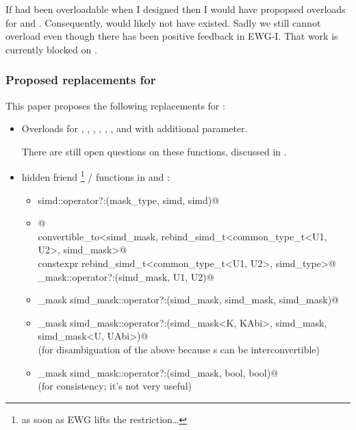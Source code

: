 If  had been overloadable when I designed \stdx\simd{} then I
would have propopsed  overloads for  and .
Consequently,  would likely not have existed.
Sadly we still cannot overload  even though there has been
positive feedback in EWG-I.
That work is currently blocked on \cite{P2600R0}.

\subsubsection{Proposed replacements for }

This paper proposes the following replacements for \stdx{}:

\begin{itemize}
  \item Overloads for ,
    ,
    ,
    , ,
    , and  with additional  parameter.

    There are still open questions on these functions, discussed in .

  \item hidden friend \footnote{as soon as EWG lifts the
    restriction\ldots} /  functions in 
    and :
    \begin{itemize}
      \item \lstinline@simd simd::operator?:(mask_type, simd, simd)@
      \item {}@\\
        \lstinline@requires convertible_to<simd_mask, rebind_simd_t<common_type_t<U1, U2>, simd_mask>@\\
        \lstinline@friend constexpr rebind_simd_t<common_type_t<U1, U2>, simd_type>@\\
        \lstinline@simd_mask::operator?:(simd_mask, U1, U2)@
      \item \lstinline@simd_mask simd_mask::operator?:(simd_mask, simd_mask, simd_mask)@
      \item \lstinline@simd_mask simd_mask::operator?:(simd_mask<K, KAbi>, simd_mask, simd_mask<U, UAbi>)@\\
        (for disambiguation of the above because s can be interconvertible)
      \item \lstinline@simd_mask simd_mask::operator?:(simd_mask, bool, bool)@\\
        (for consistency; it's not very useful)
    \end{itemize}


\end{itemize}
